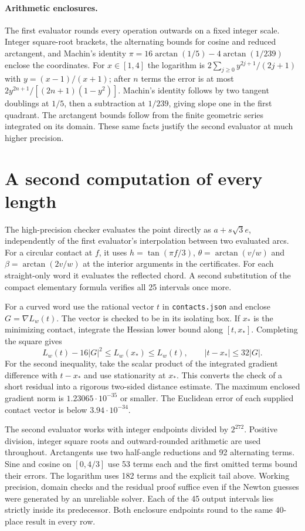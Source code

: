 \documentclass[10pt,letterpaper]{article}
\newcommand{\chapterpage}{\clearpage}
\begin{document}
\paragraph{Arithmetic enclosures.}
The first evaluator rounds every operation outwards on a fixed integer scale. Integer square-root brackets, the alternating bounds for cosine and reduced arctangent, and Machin's identity $\pi=16\arctan(1/5)-4\arctan(1/239)$ enclose the coordinates. For $x\in[1,4]$ the logarithm is $2\sum_{j\ge0}y^{2j+1}/(2j+1)$ with $y=(x-1)/(x+1)$; after $n$ terms the error is at most $2y^{2n+1}/[(2n+1)(1-y^2)]$. Machin's identity follows by two tangent doublings at $1/5$, then a subtraction at $1/239$, giving slope one in the first quadrant. The arctangent bounds follow from the finite geometric series integrated on its domain. These same facts justify the second evaluator at much higher precision.

\chapterpage


\section{A second computation of every length}
The high-precision checker evaluates the point directly as $a+s\sqrt3 e$, independently of the first evaluator's interpolation between two evaluated arcs. For a circular contact at $f$, it uses $h=\tan(\pi f/3)$, $\theta=\arctan(v/w)$ and $\beta=\arctan(2v/w)$ at the interior arguments in the certificates. For each straight-only word it evaluates the reflected chord. A second substitution of the compact elementary formula verifies all 25 intervals once more.
\par For a curved word use the rational vector $t$ in \texttt{contacts.json} and enclose $G=\nabla L_w(t)$. The vector is checked to be in its isolating box. If $x_*$ is the minimizing contact, integrate the Hessian lower bound along $[t,x_*]$. Completing the square gives
\[
  L_w(t)-16|G|^2\le L_w(x_*)\le L_w(t),\qquad
  |t-x_*|\le32|G|.
\]
For the second inequality, take the scalar product of the integrated gradient difference with $t-x_*$ and use stationarity at $x_*$. This converts the check of a short residual into a rigorous two-sided distance estimate. The maximum enclosed gradient norm is $1.23065\cdot10^{-35}$ or smaller. The Euclidean error of each supplied contact vector is below $3.94\cdot10^{-34}$.
\par The second evaluator works with integer endpoints divided by $2^{272}$. Positive division, integer square roots and outward-rounded arithmetic are used throughout. Arctangents use two half-angle reductions and 92 alternating terms. Sine and cosine on $[0,4/3]$ use 53 terms each and the first omitted terms bound their errors. The logarithm uses 182 terms and the explicit tail above. Working precision, domain checks and the residual proof suffice even if the Newton guesses were generated by an unreliable solver. Each of the 45 output intervals lies strictly inside its predecessor. Both enclosure endpoints round to the same 40-place result in every row.
\end{document}
